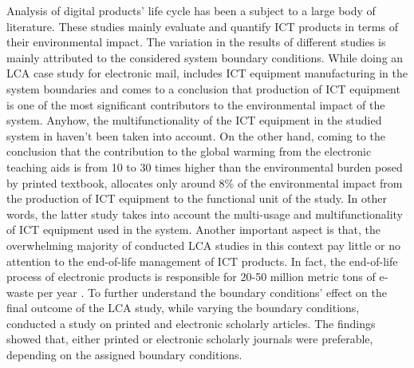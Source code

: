 \documentclass[3p,times,procedia]{elsarticle}
\begin{document}
Analysis of digital products' life cycle has been a subject to a large body of literature. These studies mainly evaluate and quantify ICT products in terms of their environmental impact. The variation in the results of different studies is mainly attributed to the considered system boundary conditions. While doing an LCA case study for electronic mail, \cite{farrant2012environmental} includes ICT equipment manufacturing in the system boundaries and comes to a conclusion that production of ICT equipment is one of the most significant contributors to the environmental impact of the system. Anyhow, the multifunctionality of the ICT equipment in the studied system in \cite{farrant2012environmental} haven't been taken into account. On the other hand, coming to the conclusion that the contribution to the global warming from the electronic teaching aids is from 10 to 30 times higher than the environmental burden posed by printed textbook, \cite{enroth2009} allocates only around 8\% of the environmental impact from the production of ICT equipment to the functional unit of the study. In other words, the latter study takes into account the multi-usage and multifunctionality of ICT equipment used in the system.
Another important aspect is that, the overwhelming majority of conducted LCA studies in this context pay little or no attention to the end-of-life management of ICT products. In fact, the end-of-life process of electronic products is responsible for 20-50 million metric tons of e-waste per year \cite{koljonen2008environmental}. To further understand the boundary conditions' effect on the final outcome of the LCA study, \cite{gard2002digital} while varying the boundary conditions, conducted a study on printed and electronic scholarly articles. The findings showed that, either printed or electronic scholarly journals were preferable, depending on the assigned boundary conditions.\\
\end{document}
